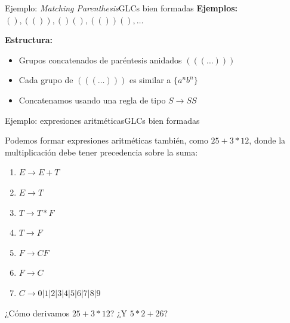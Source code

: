 \documentclass[spanish]{beamer}
\begin{document}
\begin{frame}{Ejemplo: \textit{Matching Parenthesis}}{GLCs bien formadas}
        \textbf{Ejemplos:} $(), (()), ()(), (())(), \dots$ \pause
        
        \bigskip

        \textbf{Estructura:}
        \begin{itemize}
            \item Grupos concatenados de paréntesis anidados $(((\dots)))$ \pause
            \item Cada grupo de $(((\dots)))$ es similar a $\{a^n b^n\}$ \pause
            \item<7-> Concatenamos usando una regla de tipo $S \to SS$
        \end{itemize}

        \bigskip



\end{frame}

\begin{frame}{Ejemplo: expresiones aritméticas}{GLCs bien formadas}

    Podemos formar expresiones aritméticas también, como $25+3*12$, donde la multiplicación debe tener precedencia sobre la suma: \pause

    \begin{enumerate}
        \item $E \to E + T$ \pause
        \item $E \to T$ \pause
        \item $T \to T * F$ \pause
        \item $T \to F$ \pause
        \item $F \to CF$ \pause
        \item $F \to C$ \pause
        \item $C \to 0|1|2|3|4|5|6|7|8|9$
    \end{enumerate}

    \pause

    ¿Cómo derivamos $25 + 3 * 12$? \pause ¿Y $5 * 2 + 26$?
    
\end{frame}
\end{document}
